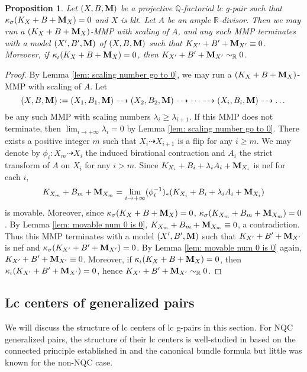 \documentclass[11pt]{amsart}
\numberwithin{equation}{section}
\newcommand{\Mm}{{\bf{M}}}
\newcommand{\Qq}{\mathbb{Q}}
\newcommand{\Rr}{\mathbb{R}}
\newtheorem{prop}[thm]{Proposition}
\theoremstyle{definition}
\theoremstyle{definition}
\theoremstyle{definition}
\begin{document}
\begin{prop}
Let $(X,B,\Mm)$ be a projective $\Qq$-factorial lc g-pair such that $\kappa_{\sigma}(K_X+B+\Mm_X)=0$ and $X$ is klt. Let $A$ be an ample $\Rr$-divisor. Then we may run a $(K_X+B+\Mm_X)$-MMP with scaling of $A$, and any such MMP terminates with a model $(X',B',\Mm)$ of $(X,B,\Mm)$ such that $K_{X'}+B'+\Mm_{X'}\equiv 0$. Moreover, if $\kappa_{\iota}(K_X+B+\Mm_X)=0$, then $K_{X'}+B'+\Mm_{X'}\sim_{\mathbb R}0$.
\end{prop}
\begin{proof}
By Lemma \ref{lem: scaling number go to 0}, we may run a $(K_X+B+\Mm_X)$-MMP with scaling of $A$. Let
$$(X,B,\Mm):=(X_1,B_1,\Mm)\dashrightarrow (X_2,B_2,\Mm)\dashrightarrow\dots\dashrightarrow (X_i,B_i,\Mm)\dashrightarrow\dots$$
be any such MMP with scaling numbers $\lambda_i\ge\lambda_{i+1}$. If this MMP does not terminate, then $\lim_{i\rightarrow+\infty}\lambda_i=0$ by Lemma \ref{lem: scaling number go to 0}. There exists a positive integer $m$ such that $X_i\dashrightarrow X_{i+1}$ is a flip for any $i\geq m$. We may denote by $\phi_i: X_m\dashrightarrow X_i$ the induced birational contraction and $A_i$ the strict transform of $A$ on $X_i$ for any $i> m.$ Since $K_{X_i}+B_i+\lambda_iA_i+\Mm_{X_i}$ is nef for each $i$,
$$K_{X_m}+B_m+\Mm_{X_m}=\lim_{i\rightarrow+\infty}(\phi_i^{-1})_*(K_{X_i}+B_i+\lambda_iA_i+\Mm_{X_i})$$
is movable. Moreover, since $\kappa_{\sigma}(K_X+B+\Mm_X)=0$, $\kappa_{\sigma}(K_{X_m}+B_m+\Mm_{X_m})=0$. By Lemma \ref{lem: movable num 0 is 0}, $K_{X_m}+B_m+\Mm_{X_m}\equiv 0$, a contradiction. Thus this MMP terminates with a model $(X',B',\Mm)$ such that $K_{X'}+B'+\Mm_{X'}$ is nef and $\kappa_{\sigma}(K_{X'}+B'+\Mm_{X'})=0$. By Lemma \ref{lem: movable num 0 is 0} again, $K_{X'}+B'+\Mm_{X'}\equiv 0$. Moreover, if $\kappa_{\iota}(K_X+B+\Mm_X)=0$, then $\kappa_{\iota}(K_{X'}+B'+\Mm_{X'})=0$, hence $K_{X'}+B'+\Mm_{X'}\sim_{\mathbb R}0$.
\end{proof}






\subsection{Lc centers of generalized pairs}

 We will discuss the structure of lc centers of lc g-pairs in this section. For NQC generalized pairs, the structure of their lc centers is well-studied in \cite{LX23a} based on the connected principle established in \cite{Bir20,FS23} and the canonical bundle formula \cite{Fil20,HL21b,JLX22,FS23} but little was known for the non-NQC case. 
\end{document}
